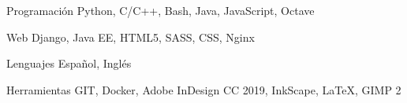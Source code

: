 

\begin{cvskills}

  \cvskill
    {Programación} %
    {Python, C/C++, Bash, Java, JavaScript, Octave} %

  \cvskill
    {Web} %
    {Django, Java EE, HTML5, SASS, CSS, Nginx} %

  \cvskill
    {Lenguajes} %
    {Español, Inglés} %

  \cvskill
    {Herramientas}
    {GIT, Docker, Adobe InDesign CC 2019, InkScape, LaTeX, GIMP 2}

\end{cvskills}
